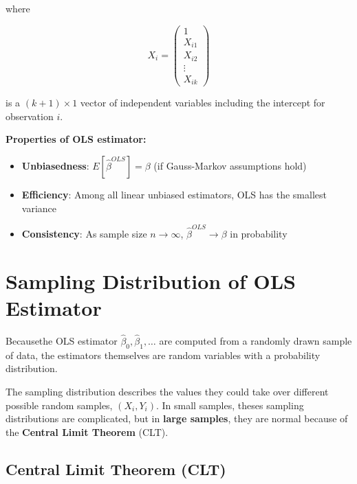 \documentclass[
  12pt,
  a4paper,
]{scrbook}
\providecommand{\tightlist}{%
  \setlength{\itemsep}{0pt}\setlength{\parskip}{0pt}}
\renewcommand{\tightlist}{\setlength{\itemsep}{0.5\baselineskip}\setlength{\parskip}{0.2\baselineskip}}
\theoremstyle{plain}
\theoremstyle{definition}
\theoremstyle{remark}
\begin{document}
where

\[
X_i = \begin{pmatrix}1 \\ X_{i1} \\ X_{i2} \\ \vdots \\ X_{ik}\end{pmatrix}
\]

is a \((k+1) \times 1\) vector of independent variables including the
intercept for observation \(i\).

\textbf{Properties of OLS estimator:}

\begin{itemize}
\tightlist
\item
  \textbf{Unbiasedness}: \(E[\hat{\beta}^{OLS}] = \beta\) (if
  Gauss-Markov assumptions hold)
\item
  \textbf{Efficiency}: Among all linear unbiased estimators, OLS has the
  smallest variance
\item
  \textbf{Consistency}: As sample size \(n \to \infty\),
  \(\hat{\beta}^{OLS} \to \beta\) in probability
\end{itemize}

\section{Sampling Distribution of OLS
Estimator}\label{sampling-distribution-of-ols-estimator}

Becausethe OLS estimator \(\hat\beta_0, \hat\beta_1, \ldots\) are
computed from a randomly drawn sample of data, the estimators themselves
are random variables with a probability distribution.

The sampling distribution describes the values they could take over
different possible random samples, \((X_i, Y_i).\) In small samples,
theses sampling distributions are complicated, but in {\textbf{large
samples}}, they are normal because of the \textbf{Central Limit Theorem}
(CLT).

\subsection{Central Limit Theorem
(CLT)}\label{central-limit-theorem-clt}
\end{document}

